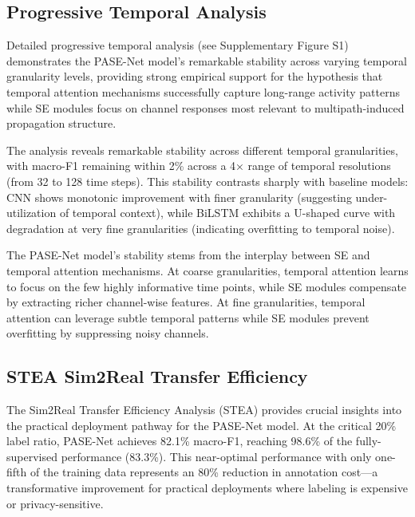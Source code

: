 \documentclass[lettersize,journal]{IEEEtran}
\begin{document}

\subsection{Progressive Temporal Analysis}

Detailed progressive temporal analysis (see Supplementary Figure S1) demonstrates the PASE-Net model's remarkable stability across varying temporal granularity levels, providing strong empirical support for the hypothesis that temporal attention mechanisms successfully capture long-range activity patterns while SE modules focus on channel responses most relevant to multipath-induced propagation structure.

The analysis reveals remarkable stability across different temporal granularities, with macro-F1 remaining within 2\% across a 4× range of temporal resolutions (from 32 to 128 time steps). This stability contrasts sharply with baseline models: CNN shows monotonic improvement with finer granularity (suggesting under-utilization of temporal context), while BiLSTM exhibits a U-shaped curve with degradation at very fine granularities (indicating overfitting to temporal noise).

The PASE-Net model's stability stems from the interplay between SE and temporal attention mechanisms. At coarse granularities, temporal attention learns to focus on the few highly informative time points, while SE modules compensate by extracting richer channel-wise features. At fine granularities, temporal attention can leverage subtle temporal patterns while SE modules prevent overfitting by suppressing noisy channels.

\subsection{STEA Sim2Real Transfer Efficiency}

The Sim2Real Transfer Efficiency Analysis (STEA) provides crucial insights into the practical deployment pathway for the PASE-Net model. At the critical 20\% label ratio, PASE-Net achieves 82.1\% macro-F1, reaching 98.6\% of the fully-supervised performance (83.3\%). This near-optimal performance with only one-fifth of the training data represents an 80\% reduction in annotation cost—a transformative improvement for practical deployments where labeling is expensive or privacy-sensitive.
\end{document}
